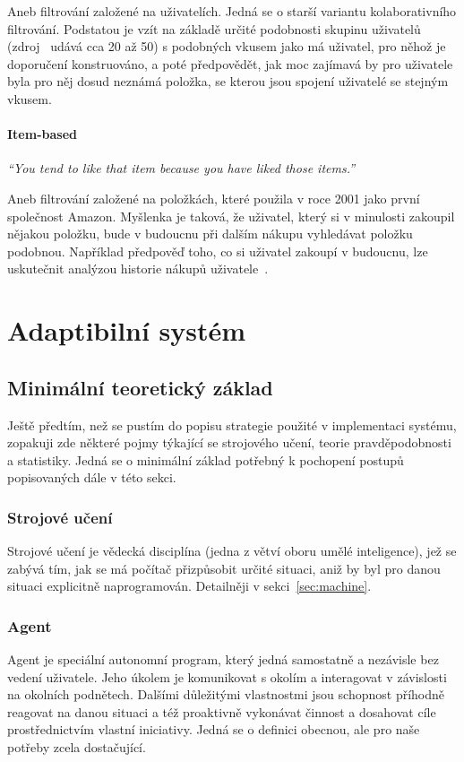 \documentclass[thesis=M,czech]{FITthesis}[2014/05/07]
\begin{document}
Aneb filtrování založené na uživatelích. Jedná se o starší variantu kolaborativního filtrování. Podstatou je vzít na základě určité podobnosti skupinu uživatelů (zdroj~\cite{cf} udává cca 20 až 50) s podobných vkusem jako má uživatel, pro něhož je doporučení konstruováno, a poté předpovědět, jak moc zajímavá by pro uživatele byla pro něj dosud neznámá položka, se kterou jsou spojení uživatelé se stejným vkusem.

\subsubsection{Item-based}

\emph{``You tend to like that item because you have liked those items.''}~\cite{cf}

Aneb filtrování založené na položkách, které použila v roce 2001 jako první společnost Amazon. Myšlenka je taková, že uživatel, který si v minulosti zakoupil nějakou položku, bude v budoucnu při dalším nákupu vyhledávat položku podobnou. Například předpověď toho, co si uživatel zakoupí v budoucnu, lze uskutečnit analýzou historie nákupů uživatele~\cite{itemcf}. 

\chapter{Adaptibilní systém}
\label{chap:adapt}

\section{Minimální teoretický základ}

Ještě předtím, než se pustím do popisu strategie použité v implementaci systému, zopakuji zde některé pojmy týkající se strojového učení, teorie pravděpodobnosti a statistiky. Jedná se o minimální základ potřebný k pochopení postupů popisovaných dále v této sekci. 

\subsection{Strojové učení}
Strojové učení je vědecká disciplína (jedna z větví oboru umělé inteligence), jež se zabývá tím, jak se má počítač přizpůsobit určité situaci, aniž by byl pro danou situaci explicitně naprogramován. Detailněji v sekci~\ref{sec:machine}.

\subsection{Agent}
\label{agent}
Agent je speciální autonomní program, který jedná samostatně a nezávisle bez vedení uživatele. Jeho úkolem je komunikovat s okolím a interagovat v závislosti na okolních podnětech. Dalšími důležitými vlastnostmi jsou schopnost příhodně reagovat na danou situaci a též proaktivně vykonávat činnost a dosahovat cíle prostřednictvím vlastní iniciativy. Jedná se o definici obecnou, ale pro naše potřeby zcela dostačující.
\end{document}

